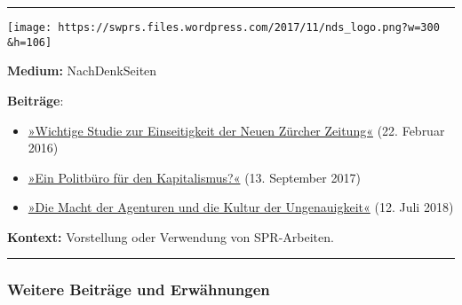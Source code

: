 \begin{center}\rule{0.5\linewidth}{\linethickness}\end{center}

\texttt{[image: https://swprs.files.wordpress.com/2017/11/nds\_logo.png?w=300\\\&h=106]}

\textbf{Medium:} NachDenkSeiten

\textbf{Beiträge}:

\begin{itemize}
\tightlist
\item
  \href{http://www.nachdenkseiten.de/?p=31487}{»Wichtige Studie zur
  Einseitigkeit der Neuen Zürcher Zeitung«} (22. Februar 2016)
\item
  \href{https://www.nachdenkseiten.de/?p=40074}{»Ein Politbüro für den
  Kapitalismus?«} (13. September 2017)
\item
  \href{https://www.nachdenkseiten.de/?p=44911}{»Die Macht der Agenturen
  und die Kultur der Ungenauigkeit«} (12. Juli 2018)
\end{itemize}

\textbf{Kontext:} Vorstellung oder Verwendung von SPR-Arbeiten.

\begin{center}\rule{0.5\linewidth}{\linethickness}\end{center}

\hypertarget{weitere-beitruxe4ge-und-erwuxe4hnungen}{%
\subsubsection{Weitere Beiträge und
Erwähnungen}\label{weitere-beitruxe4ge-und-erwuxe4hnungen}}


